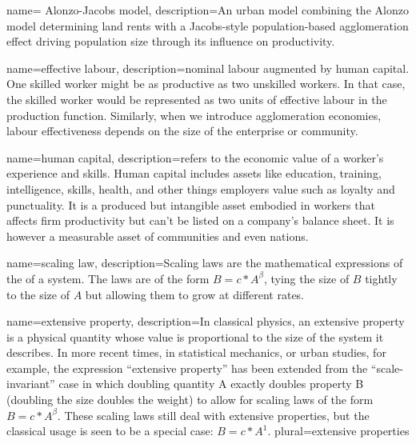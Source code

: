 {
name= Alonzo-Jacobs model,
description={An urban model combining the Alonzo \cite{alonsoModelUrbanLand1960}model determining land rents with a Jacobs-style population-based \gls{agglomeration} effect \cite{jacobsEconomyCities1969} driving population size through its influence on productivity.}
}



{
name=effective labour,
description={nominal labour augmented by \gls{human capital}. One skilled worker might be as productive as two unskilled workers. In that case,  the skilled worker would be represented as two units of effective labour in the  \gls{production function}. Similarly, when we introduce \gls{agglomeration} economies, labour effectiveness depends on the size  of the enterprise or community.}
}


{
name=human capital,
description={refers to the economic value of a worker's experience and skills. Human capital includes assets like education, training, intelligence, skills, health, and other things employers value such as loyalty and punctuality. It is a produced but intangible asset embodied in workers that affects firm productivity but can't be listed on a company's balance sheet. It is however a measurable asset of communities and even nations.}
}

{
name=scaling law,
description={Scaling laws are the mathematical expressions of the  of a system. The laws are of the form  $B=c*A^\beta$, tying the size of $B$ tightly to the size of $A$ but allowing them to grow at different rates.}
}

{
name=extensive property,
description={In classical  physics, an extensive property is a physical quantity whose value is proportional to the size of the system it describes. In more recent times, in statistical mechanics, or urban studies, for example, the expression ``extensive property'' has  been extended from  the ``scale-invariant'' case in which  doubling quantity A exactly  doubles property B (doubling the size doubles the weight) to allow for scaling laws of the form $B=c*A^\beta$. These \glspl{scaling law} still deal with extensive properties, but the classical usage is seen to be a special case: $B=c*A^1$.}
plural={extensive properties}
}




